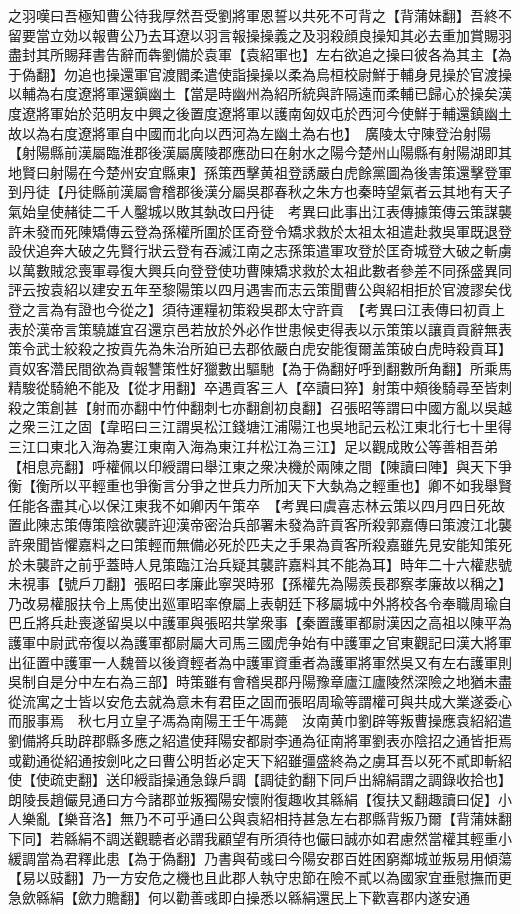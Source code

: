 之羽嘆曰吾極知曹公待我厚然吾受劉將軍恩誓以共死不可背之【背蒲妹翻】吾終不留要當立効以報曹公乃去耳遼以羽言報操操義之及羽殺顔良操知其必去重加賞賜羽盡封其所賜拜書告辭而犇劉備於袁軍【袁紹軍也】左右欲追之操曰彼各為其主【為于偽翻】勿追也操還軍官渡閻柔遣使詣操操以柔為烏桓校尉鮮于輔身見操於官渡操以輔為右度遼將軍還鎭幽土【當是時幽州為紹所統與許隔遠而柔輔已歸心於操矣漢度遼將軍始於范明友中興之後置度遼將軍以護南匈奴屯於西河今使鮮于輔還鎮幽土故以為右度遼將軍自中國而北向以西河為左幽土為右也】　廣陵太守陳登治射陽【射陽縣前漢屬臨淮郡後漢屬廣陵郡應劭曰在射水之陽今楚州山陽縣有射陽湖即其地賢曰射陽在今楚州安宜縣東】孫策西擊黄祖登誘嚴白虎餘黨圖為後害策還擊登軍到丹徒【丹徒縣前漢屬會稽郡後漢分屬吳郡春秋之朱方也秦時望氣者云其地有天子氣始皇使赭徒二千人鑿城以敗其埶改曰丹徒　考異曰此事出江表傳據策傳云策謀襲許未發而死陳矯傳云登為孫權所圍於匡奇登令矯求救於太祖太祖遣赴救吳軍既退登設伏追奔大破之先賢行狀云登有吞滅江南之志孫策遣軍攻登於匡奇城登大破之斬虜以萬數賊忿喪軍尋復大興兵向登登使功曹陳矯求救於太祖此數者參差不同孫盛異同評云按袁紹以建安五年至黎陽策以四月遇害而志云策聞曹公與紹相拒於官渡謬矣伐登之言為有證也今從之】須待運糧初策殺吳郡太守許貢　【考異曰江表傳曰初貢上表於漢帝言策驍雄宜召還京邑若放於外必作世患候吏得表以示策策以讓貢貢辭無表策令武士絞殺之按貢先為朱治所廹已去郡依嚴白虎安能復爾盖策破白虎時殺貢耳】貢奴客濳民間欲為貢報讐策性好獵數出驅馳【為于偽翻好呼到翻數所角翻】所乘馬精駿從騎絶不能及【從才用翻】卒遇貢客三人【卒讀曰猝】射策中頰後騎尋至皆刺殺之策創甚【射而亦翻中竹仲翻刺七亦翻創初良翻】召張昭等謂曰中國方亂以吳越之衆三江之固【韋昭曰三江謂吳松江錢塘江浦陽江也吳地記云松江東北行七十里得三江口東北入海為婁江東南入海為東江幷松江為三江】足以觀成敗公等善相吾弟【相息亮翻】呼權佩以印綬謂曰舉江東之衆决機於兩陳之間【陳讀曰陣】與天下爭衡【衡所以平輕重也爭衡言分爭之世兵力所加天下大埶為之輕重也】卿不如我舉賢任能各盡其心以保江東我不如卿丙午策卒　【考異曰虞喜志林云策以四月四日死故置此陳志策傳策陰欲襲許迎漢帝密治兵部署未發為許貢客所殺郭嘉傳曰策渡江北襲許衆聞皆懼嘉料之曰策輕而無備必死於匹夫之手果為貢客所殺嘉雖先見安能知策死於未襲許之前乎蓋時人見策臨江治兵疑其襲許嘉料其不能為耳】時年二十六權悲號未視事【號戶刀翻】張昭曰孝廉此寧哭時邪【孫權先為陽羨長郡察孝廉故以稱之】乃改易權服扶令上馬使出廵軍昭率僚屬上表朝廷下移屬城中外將校各令奉職周瑜自巴丘將兵赴喪遂留吳以中護軍與張昭共掌衆事【秦置護軍都尉漢因之高祖以陳平為護軍中尉武帝復以為護軍都尉屬大司馬三國虎争始有中護軍之官東觀記曰漢大將軍出征置中護軍一人魏晉以後資輕者為中護軍資重者為護軍將軍然吳又有左右護軍則吳制自是分中左右為三部】時策雖有會稽吳郡丹陽豫章廬江廬陵然深險之地猶未盡從流寓之士皆以安危去就為意未有君臣之固而張昭周瑜等謂權可與共成大業遂委心而服事焉　秋七月立皇子馮為南陽王壬午馮薨　汝南黄巾劉辟等叛曹操應袁紹紹遣劉備將兵助辟郡縣多應之紹遣使拜陽安都尉李通為征南將軍劉表亦陰招之通皆拒焉或勸通從紹通按劍叱之曰曹公明哲必定天下紹雖彊盛終為之虜耳吾以死不貳即斬紹使【使疏吏翻】送印綬詣操通急錄戶調【調徒釣翻下同戶出綿絹謂之調錄收拾也】朗陵長趙儼見通曰方今諸郡並叛獨陽安懷附復趣收其緜絹【復扶又翻趣讀曰促】小人樂亂【樂音洛】無乃不可乎通曰公與袁紹相持甚急左右郡縣背叛乃爾【背蒲妹翻下同】若緜絹不調送觀聽者必謂我顧望有所須待也儼曰誠亦如君慮然當權其輕重小緩調當為君釋此患【為于偽翻】乃書與荀彧曰今陽安郡百姓困窮鄰城並叛易用傾蕩【易以豉翻】乃一方安危之機也且此郡人執守忠節在險不貳以為國家宜垂慰撫而更急歛緜絹【歛力贍翻】何以勸善彧即白操悉以緜絹還民上下歡喜郡内遂安通